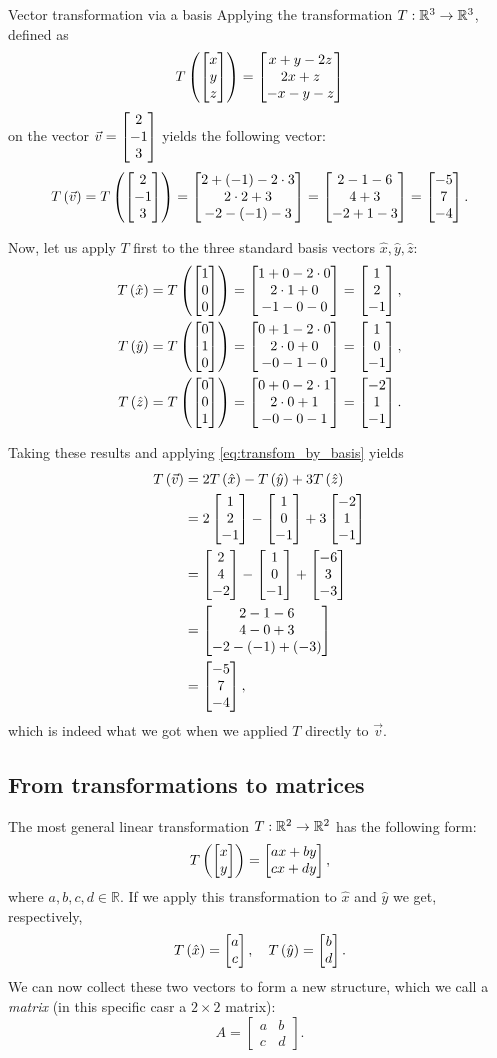 \begin{example}{Vector transformation via a basis}{}
	Applying the transformation $T:\mathbb{R}^{3}\to\mathbb{R}^{3}$, defined as
	\[
		T\left(\colvec{x;y;z}\right)=\colvec{x+y-2z;2x+z;-x-y-z}
	\]
	on the vector $\vec{v}=\colvec{2;-1;3}$ yields the following vector:
	\[
		T\left(\vec{v}\right) = T\left(\colvec{2;-1;3}\right) = \colvec{2+(-1)-2\cdot3;2\cdot2+3;-2-(-1)-3} = \colvec{2-1-6;4+3;-2+1-3} = \colvec{-5;7;-4}.
	\]

	Now, let us apply $T$ first to the three standard basis vectors $\hat{x},\hat{y},\hat{z}$:
	\begin{align*}
		T\left( \hat{x} \right) &= T\left(\colvec{1;0;0}\right) = \colvec{1+0-2\cdot0;2\cdot1+0;-1-0-0} = \colvec{1;2;-1},\\
		T\left( \hat{y} \right) &= T\left(\colvec{0;1;0}\right) = \colvec{0+1-2\cdot0;2\cdot0+0;-0-1-0} = \colvec{1;0;-1},\\
		T\left( \hat{z} \right) &= T\left(\colvec{0;0;1}\right) = \colvec{0+0-2\cdot1;2\cdot0+1;-0-0-1} = \colvec{-2;1;-1}.
	\end{align*}

	Taking these results and applying \autoref{eq:transfom_by_basis} yields
	\begin{align*}
		T\left( \vec{v} \right) &= 2T \left( \hat{x} \right) -T \left( \hat{y} \right) + 3T \left( \hat{z} \right)\\
								&= 2\colvec{1;2;-1} - \colvec{1;0;-1} + 3\colvec{-2;1;-1}\\
								&= \colvec{2;4;-2} - \colvec{1;0;-1} + \colvec{-6;3;-3}\\
								&= \colvec{2-1-6;4-0+3;-2-(-1)+(-3)}\\
								&= \colvec{-5;7;-4},
	\end{align*}
	which is indeed what we got when we applied $T$ directly to $\vec{v}$.
\end{example}

\subsection{From transformations to matrices}
The most general linear transformation $T:\mathbb{R}^{2}\to\mathbb{R}^{2}$ has the following form:
\begin{equation}
	T \left( \colvec{x;y} \right) = \colvec{ax+by;cx+dy},
	\label{eq:generic_R2_LT}
\end{equation}
where $a,b,c,d\in\mathbb{R}$. If we apply this transformation to $\hat{x}$ and $\hat{y}$ we get, respectively,
\begin{equation}
	T \left( \hat{x} \right) = \colvec{a;c},\quad T \left( \hat{y} \right) = \colvec{b;d}.
	\label{eq:}
\end{equation}
We can now collect these two vectors to form a new structure, which we call a \emph{matrix} (in this specific casr a $2\times2$ matrix):
\begin{equation}
	A = \begin{bmatrix} a&b\\c&d \end{bmatrix}.
	\label{eq:matrix}
\end{equation}

